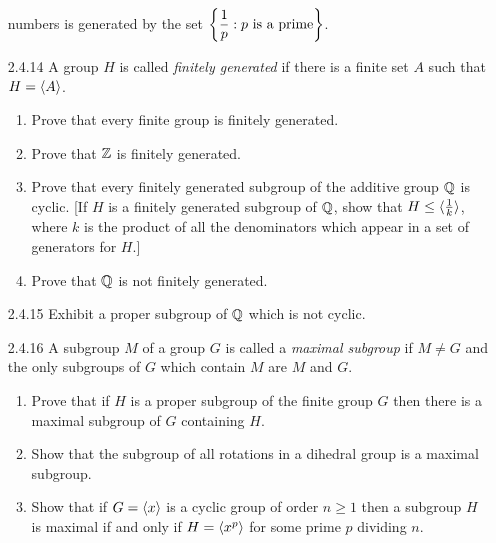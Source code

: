 \begin{enumerate}
                  numbers is generated by the set
                  $\left\{\displaystyle\frac{1}{p} : p \text{ is a prime}\right\}$.
   \item[2.4.14]  A group $H$ is called \textit{finitely generated} if there is
                  a finite set $A$ such that $H = \langle A \rangle$.
                  \begin{enumerate}
                     \item Prove that every finite group is finitely generated.
                     \item Prove that $\mathbb{Z}$ is finitely generated.
                     \item Prove that every finitely generated subgroup of the
                           additive group $\mathbb{Q}$ is cyclic. [If $H$ is a finitely
                           generated subgroup of $\mathbb{Q}$, show that
                           $H \le \langle \frac{1}{k} \rangle$, where $k$ is the product
                           of all the denominators which appear in a set of
                           generators for $H$.]
                     \item Prove that $\mathbb{Q}$ is not finitely generated.
                  \end{enumerate}
   \item[2.4.15]  Exhibit a proper subgroup of $\mathbb{Q}$ which is not cyclic.
   \item[2.4.16]  A subgroup $M$ of a group $G$ is called a
                  \textit{maximal subgroup} if $M \neq G$ and the only subgroups
                  of $G$ which contain $M$ are $M$ and $G$.
                  \begin{enumerate}
                     \item Prove that if $H$ is a proper subgroup of the finite
                           group $G$ then there is a maximal subgroup of $G$
                           containing $H$.
                     \item Show that the subgroup of all rotations in a dihedral
                           group is a maximal subgroup.
                     \item Show that if $G = \langle x \rangle$ is a cyclic group of order
                           $n \ge 1$ then a subgroup $H$ is maximal if and only
                           if $H = \langle x^p \rangle$ for some prime $p$ dividing $n$.

\end{enumerate}
\end{enumerate}
